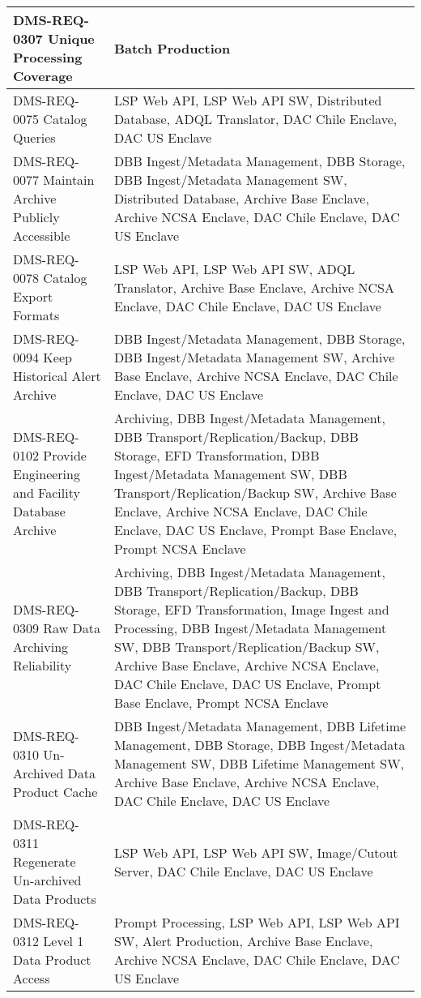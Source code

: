 \begin{longtable}{p{}p{}}
DMS-REQ-0307 Unique Processing Coverage & Batch Production \\ \hline
DMS-REQ-0075 Catalog Queries & LSP Web API, LSP Web API SW, Distributed Database, ADQL Translator, DAC Chile Enclave, DAC US Enclave \\ \hline
DMS-REQ-0077 Maintain Archive Publicly Accessible & DBB Ingest/Metadata Management, DBB Storage, DBB Ingest/Metadata Management SW, Distributed Database, Archive Base Enclave, Archive NCSA Enclave, DAC Chile Enclave, DAC US Enclave \\ \hline
DMS-REQ-0078 Catalog Export Formats & LSP Web API, LSP Web API SW, ADQL Translator, Archive Base Enclave, Archive NCSA Enclave, DAC Chile Enclave, DAC US Enclave \\ \hline
DMS-REQ-0094 Keep Historical Alert Archive & DBB Ingest/Metadata Management, DBB Storage, DBB Ingest/Metadata Management SW, Archive Base Enclave, Archive NCSA Enclave, DAC Chile Enclave, DAC US Enclave \\ \hline
DMS-REQ-0102 Provide Engineering and Facility Database Archive & Archiving, DBB Ingest/Metadata Management, DBB Transport/Replication/Backup, DBB Storage, EFD Transformation, DBB Ingest/Metadata Management SW, DBB Transport/Replication/Backup SW, Archive Base Enclave, Archive NCSA Enclave, DAC Chile Enclave, DAC US Enclave, Prompt Base Enclave, Prompt NCSA Enclave \\ \hline
DMS-REQ-0309 Raw Data Archiving Reliability & Archiving, DBB Ingest/Metadata Management, DBB Transport/Replication/Backup, DBB Storage, EFD Transformation, Image Ingest and Processing, DBB Ingest/Metadata Management SW, DBB Transport/Replication/Backup SW, Archive Base Enclave, Archive NCSA Enclave, DAC Chile Enclave, DAC US Enclave, Prompt Base Enclave, Prompt NCSA Enclave \\ \hline
DMS-REQ-0310 Un-Archived Data Product Cache & DBB Ingest/Metadata Management, DBB Lifetime Management, DBB Storage, DBB Ingest/Metadata Management SW, DBB Lifetime Management SW, Archive Base Enclave, Archive NCSA Enclave, DAC Chile Enclave, DAC US Enclave \\ \hline
DMS-REQ-0311 Regenerate Un-archived Data Products & LSP Web API, LSP Web API SW, Image/Cutout Server, DAC Chile Enclave, DAC US Enclave \\ \hline
DMS-REQ-0312 Level 1 Data Product Access & Prompt Processing, LSP Web API, LSP Web API SW, Alert Production, Archive Base Enclave, Archive NCSA Enclave, DAC Chile Enclave, DAC US Enclave \\ \hline

\end{longtable}
